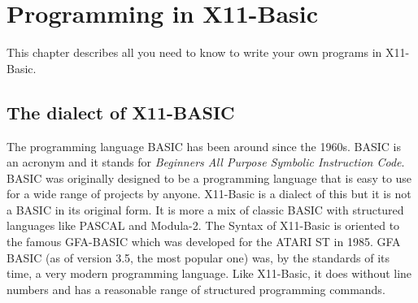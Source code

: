
\chapter{Programming in X11-Basic}

This chapter describes all you need to know to write your own programs
in X11-Basic.

\section{The dialect of X11-BASIC}

The programming language BASIC has been around since the 1960s. BASIC is an
acronym and it stands for {\em Beginners All Purpose Symbolic Instruction
Code}. BASIC was originally designed to be a programming language that is easy
to use for a wide range of projects by anyone.
X11-Basic is a dialect of this but it is not a BASIC in its original form. It is
more a mix of classic BASIC with structured languages like PASCAL and Modula-2.
The Syntax of X11-Basic is oriented to the famous GFA-BASIC which was
developed for the ATARI ST in 1985. GFA BASIC (as of version 3.5, the most
popular one) was, by the standards of its time, a very modern programming
language. Like X11-Basic, it does without line numbers and has a
reasonable range of structured programming commands.

